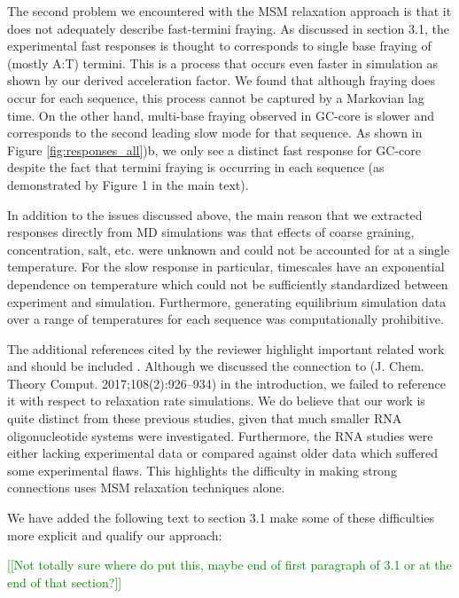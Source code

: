 \documentclass[11pt,a4paper]{letter} %
\newcommand*{\noteg}[1]{\textcolor{green}{[[#1]]}}		%
\begin{document}
The second problem we encountered with the MSM relaxation approach is that it does not adequately describe fast-termini fraying. As discussed in section 3.1, the experimental fast responses is thought to corresponds to single base fraying of (mostly A:T) termini. This is a process that occurs even faster in simulation as shown by our derived acceleration factor. We found that although fraying does occur for each sequence, this process cannot be captured by a Markovian lag time. On the other hand, multi-base fraying observed in GC-core is slower and corresponds to the second leading slow mode for that sequence. As shown in Figure \ref{fig:responses_all})b, we only see a distinct fast response for GC-core despite the fact that termini fraying is occurring in each sequence (as demonstrated by Figure 1 in the main text). 

In addition to the issues discussed above, the main reason that we extracted responses directly from MD simulations was that effects of coarse graining, concentration, salt, etc. were unknown and could not be accounted for at a single temperature. For the slow response in particular,  timescales have an exponential dependence on temperature which could not be sufficiently standardized between experiment and simulation. Furthermore, generating equilibrium simulation data over a range of temperatures for each sequence was computationally prohibitive. 

The additional references cited by the reviewer highlight important related work and should be included \citep{Noe2011DynamicalExperiments, Pinamonti2017, Remington2019MolecularKinetics}. Although we discussed the connection to (J. Chem. Theory Comput. 2017;108(2):926–934)\citep{Pinamonti2017} in the introduction, we failed to reference it with respect to relaxation rate simulations. We do believe that our work is quite distinct from these previous studies, given that much smaller RNA oligonucleotide systems were investigated. Furthermore, the RNA studies were either lacking experimental data or compared against older data which suffered some experimental flaws. This highlights the difficulty in making strong connections uses MSM relaxation techniques alone.

We have added the following text to section 3.1 make some of these difficulties more explicit and qualify our approach:

\noteg{Not totally sure where do put this, maybe end of first paragraph of 3.1 or at the end of that section?}
\end{document}
